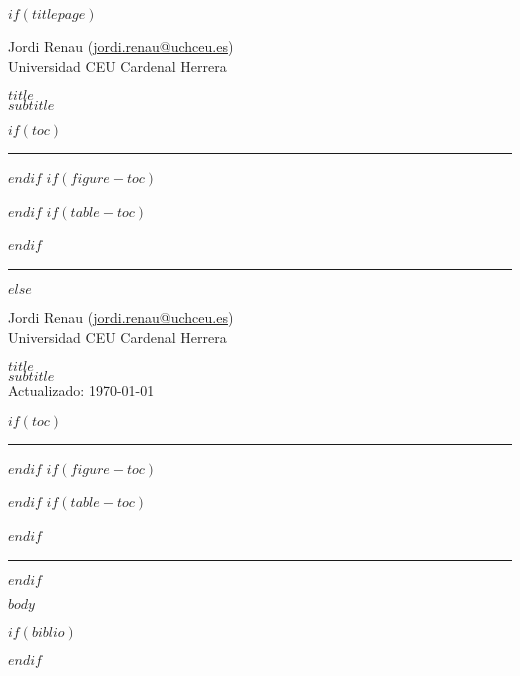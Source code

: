 \documentclass[$fontsize$,a4paper,twoside,onecolumn]{scrartcl}
\author{$author$}
\subtitle{$subtitle$}
\date{$date$}
\newcommand{\mititulo}{ $title$ }
\newcommand{\misubtitulo}{ $subtitle$ }
\begin{document}
	\renewcommand{\tablename}{Tabla}
	
$if(titlepage)$
	\begin{titlepage}
		\begin{flushright}
			\large
			Jordi Renau (\href{mailto:jordi.renau@uchceu.es}{jordi.renau@uchceu.es}) \\
			Universidad CEU Cardenal Herrera %

		\Huge 
		\mititulo \\[0.5cm]
		\huge
		\misubtitulo \\[1.5cm]
	\end{flushright}
	\small
	$if(toc)$
	\hrule
	\renewcommand{\contentsname}{Contenidos \small (\textit{Actualizado}: \today)}
	\tableofcontents 
	$endif$
	$if(figure-toc)$
	\renewcommand{\listfigurename}{Lista de figuras}
	\listoffigures
	$endif$
	$if(table-toc)$
	\renewcommand{\listtablename}{Lista de tablas}
	\listoftables
	\normalsize
	$endif$
	~
	\hrule
	
	\end{titlepage}

$else$
		\begin{flushright}
				\thispagestyle{empty}
				\large
				Jordi Renau (\href{mailto:jordi.renau@uchceu.es}{jordi.renau@uchceu.es}) \\
				Universidad CEU Cardenal Herrera %
			
				\Huge 
				\mititulo \\[0.5cm]
				\huge
				\misubtitulo \\[0.5cm]
				\small Actualizado: \today
	\end{flushright}
	$if(toc)$
		\small
		\hrule
		\renewcommand{\contentsname}{Contenidos}
		\tableofcontents 
		$endif$
		$if(figure-toc)$
		\renewcommand{\listfigurename}{Lista de figuras}
		\listoffigures
		$endif$
		$if(table-toc)$
		\renewcommand{\listtablename}{Lista de tablas}
		\listoftables
		\normalsize
		$endif$
		~
		\hrule
$endif$




$body$

$if(biblio)$
	
	
$endif$
\end{document}
